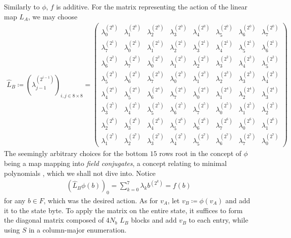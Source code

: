 \begin{enumerate}[label=(\roman*')]
    Similarly to \(\phi\), \(f\) is additive. For the matrix representing the action of the linear map \(L_A\), we may choose
    \newcommand{\lampow}[2]{\lambda_{#1}^{\left(2^{#2}\right)}}
    \begin{align}
        \hat{L}_B \coloneqq \left(\lampow{j-1}{i-1}\right)_{i, j \in 8 \times 8} = \begin{pmatrix}
            \lampow{0}{0} & \lampow{1}{0} & \lampow{2}{0} & \lampow{3}{0} & \lampow{4}{0} & \lampow{5}{0} & \lampow{6}{0} & \lampow{7}{0}\\
            \lampow{7}{1} & \lampow{0}{1} & \lampow{1}{1} & \lampow{2}{1} & \lampow{3}{1} & \lampow{4}{1} & \lampow{5}{1} & \lampow{6}{1}\\
            \lampow{6}{2} & \lampow{7}{2} & \lampow{0}{2} & \lampow{1}{2} & \lampow{2}{2} & \lampow{3}{2} & \lampow{4}{2} & \lampow{5}{2}\\
            \lampow{5}{3} & \lampow{6}{3} & \lampow{7}{3} & \lampow{0}{3} & \lampow{1}{3} & \lampow{2}{3} & \lampow{3}{3} & \lampow{4}{3}\\
            \lampow{4}{4} & \lampow{5}{4} & \lampow{6}{4} & \lampow{7}{4} & \lampow{0}{4} & \lampow{1}{4} & \lampow{2}{4} & \lampow{3}{4}\\
            \lampow{3}{5} & \lampow{4}{5} & \lampow{5}{5} & \lampow{6}{5} & \lampow{7}{5} & \lampow{0}{5} & \lampow{1}{5} & \lampow{2}{5}\\
            \lampow{2}{6} & \lampow{3}{6} & \lampow{4}{6} & \lampow{5}{6} & \lampow{6}{6} & \lampow{7}{6} & \lampow{0}{6} & \lampow{1}{6}\\
            \lampow{1}{7} & \lampow{2}{7} & \lampow{3}{7} & \lampow{4}{7} & \lampow{5}{7} & \lampow{6}{7} & \lampow{7}{7} & \lampow{0}{7}
        \end{pmatrix}
    \end{align}
    The seemingly arbitrary choices for the bottom \(15\) rows root in the concept of \(\phi\) being a map mapping into \emph{field conjugates}, a concept relating to minimal polynomials \cite[p. 286]{Karpfinger_2017}, which we shall not dive into. Notice
    \begin{align}
        (\hat{L}_B \phi(b))_0 = \sum_{k=0}^7 \lambda_k b^{\left(2^k\right)} = f(b)
    \end{align}
    for any \(b \in F\), which was the desired action. As for \(v_A\), let \(v_B \coloneqq \phi(v_A)\) and add it to the state byte. To apply the matrix on the entire state, it suffices to form the diagonal matrix composed of \(4N_b\) \(L_B\) blocks and add \(v_B\) to each entry, while using \(S\) in a column-major enumeration.

\end{enumerate}
